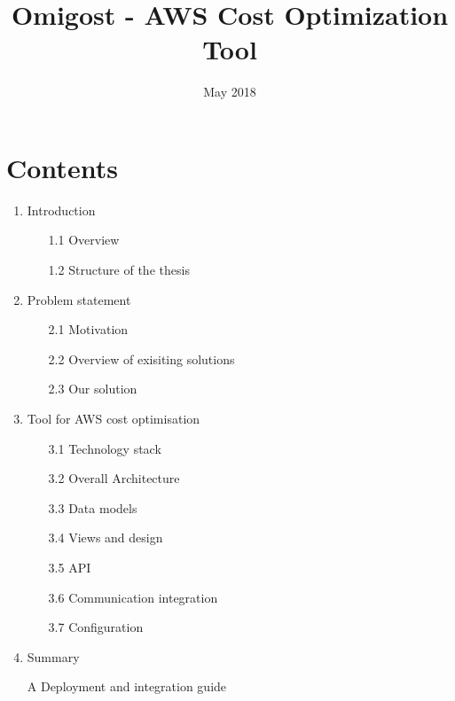 \documentclass[licencjacka,en]{thesisclass}
\title{Omigost - AWS Cost Optimization Tool}
\date{May 2018}
\begin{document}
\maketitle

\begin{abstract}
  
\end{abstract}

\chapter*{Contents}

\begin{enumerate}
    \item Introduction
        \begin{enumerate}
            \item [1.1] Overview
            \item [1.2] Structure of the thesis 
        \end{enumerate}
    \item Problem statement
        \begin{enumerate}
            \item [2.1] Motivation
            \item [2.2] Overview of exisiting solutions
            \item [2.3] Our solution
        \end{enumerate}
    \item Tool for AWS cost optimisation
        \begin{enumerate}
            \item [3.1] Technology stack
            \item [3.2] Overall Architecture
            \item [3.3] Data models
            \item [3.4] Views and design
            \item [3.5] API
            \item [3.6] Communication integration
            \item [3.7] Configuration
        \end{enumerate}
    \item Summary
    \item [A] Deployment and integration guide
\end{enumerate}

\end{document}
